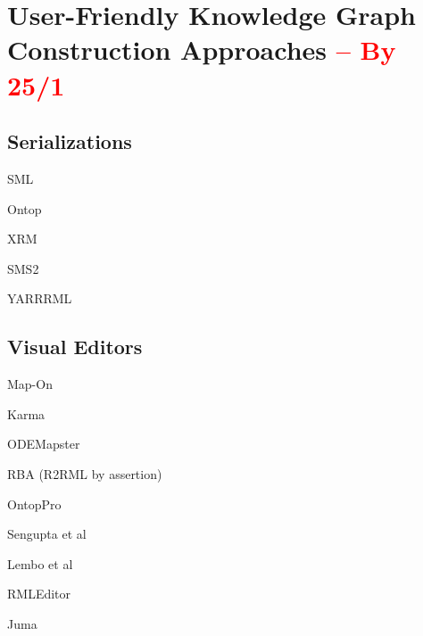 \section{User-Friendly Knowledge Graph Construction Approaches \textcolor{red}{-- By 25/1}}
\label{sec:chp2_easy_kgc}


\subsection{Serializations}

SML~\parencite{Stadler2015sml}

Ontop~\parencite{rodriguez2015efficient}

XRM~\parencite{xrm}

SMS2~\parencite{sms2}

YARRRML~\parencite{Heyvaert2018yarrrml}



\subsection{Visual Editors}

Map-On~\parencite{sicilia2017map}

Karma~\parencite{gupta2012karma}

ODEMapster~\parencite{barrasa2006odemapster}

RBA (R2RML by assertion)

OntopPro~\parencite{calvanese2017ontop}

Sengupta et al~\parencite{sengupta2013editing}

Lembo et al~\parencite{lembo2014visualization}

RMLEditor~\parencite{heyvaert2016rmleditor}

Juma~\parencite{crotti2017juma}